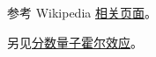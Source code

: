 
\begin{issues}
\issueDraft
\end{issues}

参考 Wikipedia \href{https://en.wikipedia.org/wiki/Quantum_Hall_effect}{相关页面}。

另见\href{https://en.wikipedia.org/wiki/Fractional_quantum_Hall_effect}{分数量子霍尔效应}。
